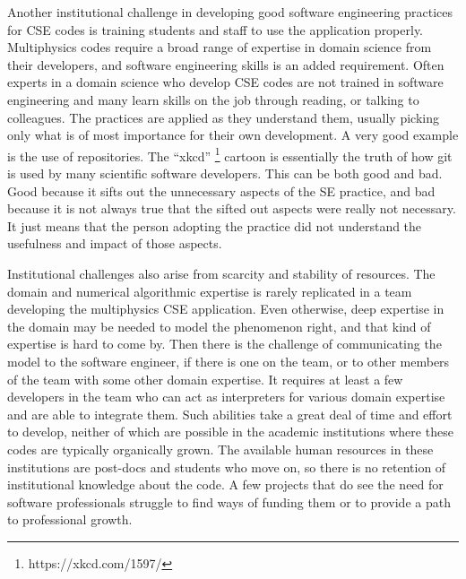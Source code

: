 Another institutional challenge in developing good software
engineering practices for CSE codes is training students and staff to
use the application properly. Multiphysics codes require a broad range
of expertise in domain science from their developers, and software
engineering skills is an added requirement.  Often experts in a domain
science who develop CSE codes are not trained in software engineering
and many learn skills on the job through reading, or talking to
colleagues. The practices are applied as they understand them, usually
picking only what is of most importance for their own development. A
very good example is the use of repositories. The ``xkcd''
\footnote{https://xkcd.com/1597/} cartoon is
essentially the truth of how git is used by many scientific software
developers. 
This can be both good and bad. Good because it sifts out the unnecessary aspects of the SE
practice, and bad because it is not always true that the sifted out
aspects were really not necessary. It just means that the person
adopting the practice did not understand the usefulness and impact of
those aspects.


Institutional challenges also arise from scarcity and stability of
resources. The domain and numerical algorithmic
expertise is rarely replicated in a team developing the multiphysics
CSE application.  Even otherwise, deep expertise in the domain may be
needed to model the phenomenon right, and that kind of expertise is
hard to come by. Then there is the challenge of communicating the
model to the software engineer, if there is one on the team, or to
other members of the team with some other domain expertise. It requires at least a
few developers in the team who can act as interpreters for various
domain expertise and are able to integrate them. Such abilities take a
great deal of time and effort to develop, neither of which are
possible in the academic institutions where these codes are typically
organically grown. The available human resources in these institutions
are post-docs and students who move on, so there is no retention of
institutional knowledge about the code.  A few projects that do see
the need for software professionals struggle to find ways of funding
them or to provide a path to professional growth. 

